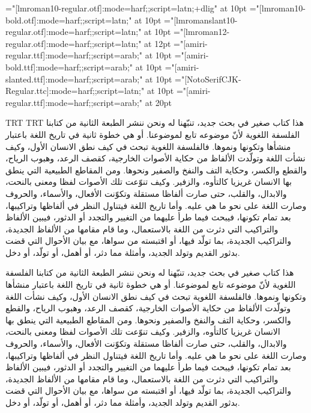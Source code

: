 
\def\mode{mode=node;}
\iftrue
  \def\mode{mode=harf;}
\fi
\font\testr="[lmroman10-regular.otf]:\mode;script=latn;+dlig" at 10pt
\font\testb="[lmroman10-bold.otf]:\mode;script=latn;" at 10pt
\font\testi="[lmromanslant10-regular.otf]:\mode;script=latn;" at 10pt
\font\testR="[lmroman12-regular.otf]:\mode;script=latn;" at 12pt
\font\testA="[amiri-regular.ttf]:\mode;script=arab;" at 10pt
\font\testB="[amiri-bold.ttf]:\mode;script=arab;" at 10pt
\font\testI="[amiri-slanted.ttf]:\mode;script=arab;" at 10pt
\font\testF="[NotoSerifCJK-Regular.ttc]:\mode;script=latn;" at 10pt
\font\testa="[amiri-regular.ttf]:\mode;script=arab;" at 20pt

\begingroup
\testA

\begingroup
\pardir TRT
\textdir TRT
هذا كتاب صغير في بحث جديد، تنبّهنا له ونحن ننشر الطبعة الثانية من كتابنا الفلسفة
اللغوية لأنّ موضوعه تابع لموضوعنا. أو هي خطوة ثانية في تاريخ اللغة باعتبار
منشأها وتكونها ونموها. فالفلسفة اللغوية تبحث في كيف نطق الانسان الأول، وكيف
نشأت اللغة وتولّدت الألفاظ من حكاية الأصوات الخارجية، ك{\testB قصف الرعد}، وهبوب الرياح،
والقطع والكسر، وحكاية التف والنفخ والصفير ونحوها. ومن المقاطع الطبيعية التي
ينطق بها الانسان غريزيا كالتأوه، والزفير. وكيف تنوّعت تلك الأصوات لفظا ومعنى
بالنحت، والابدال، والقلب، حتى صارت ألفاظا مستقلة وتكوّنت الأفعال، والأسماء،
والحروف وصارت اللغة على نحو ما هي عليه.  وأما تاريخ اللغة فيتناول النظر في
ألفاظها وتراكيبها، بعد تمام تكونها، فيبحث فيما طرأ عليهما من التغيير والتجدد أو
الدثور، فيبين الألفاظ والتراكيب التي دثرت من اللغة بالاستعمال، وما قام مقامها
من الألفاظ الجديدة، والتراكيب الجديدة، بما تولّد فيها، أو اقتبسته من سواها، مع
بيان الأحوال التي قضت بدثور القديم وتولد الجديد، وأمثلة مما دثر، أو أهمل، أو
تولّد، أو دخل.

\testa
هذا كتاب صغير في بحث جديد، تنبّهنا له ونحن ننشر الطبعة الثانية من كتابنا الفلسفة
اللغوية لأنّ موضوعه تابع لموضوعنا. أو هي خطوة ثانية في تاريخ اللغة باعتبار
منشأها وتكونها ونموها. فالفلسفة اللغوية تبحث في كيف نطق الانسان الأول، وكيف
نشأت اللغة وتولّدت الألفاظ من حكاية الأصوات الخارجية، ك{\testB قصف الرعد}، وهبوب الرياح،
والقطع والكسر، وحكاية التف والنفخ والصفير ونحوها. ومن المقاطع الطبيعية التي
ينطق بها الانسان غريزيا كالتأوه، والزفير. وكيف تنوّعت تلك الأصوات لفظا ومعنى
بالنحت، والابدال، والقلب، حتى صارت ألفاظا مستقلة وتكوّنت الأفعال، والأسماء،
والحروف وصارت اللغة على نحو ما هي عليه.  وأما تاريخ اللغة فيتناول النظر في
ألفاظها وتراكيبها، بعد تمام تكونها، فيبحث فيما طرأ عليهما من التغيير والتجدد أو
الدثور، فيبين الألفاظ والتراكيب التي دثرت من اللغة بالاستعمال، وما قام مقامها
من الألفاظ الجديدة، والتراكيب الجديدة، بما تولّد فيها، أو اقتبسته من سواها، مع
بيان الأحوال التي قضت بدثور القديم وتولد الجديد، وأمثلة مما دثر، أو أهمل، أو
تولّد، أو دخل.
\endgroup

